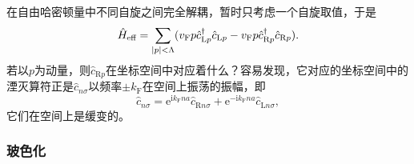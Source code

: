 \documentclass[hyperref, UTF8, a4paper]{ctexart}
\newcommand*{\ii}{\mathrm{i}}
\newcommand*{\ee}{\mathrm{e}}
\begin{document}
在自由哈密顿量中不同自旋之间完全解耦，暂时只考虑一个自旋取值，于是
\begin{equation}
    \hat{H}_\text{eff} = \sum_{\abs{p} < \Lambda} (v_\text{F} p \hat{c}^\dagger_{\text{L} p} \hat{c}_{\text{L} p} - v_\text{F} p \hat{c}^\dagger_{\text{R} p} \hat{c}_{\text{R} p}).
    \label{eq:one-dimension-linear-model}
\end{equation}
若以$p$为动量，则$\hat{c}_{\text{R} p}$在坐标空间中对应着什么？容易发现，它对应的坐标空间中的湮灭算符正是$\hat{c}_{n\sigma}$以频率$\pm k_\text{F}$在空间上振荡的振幅，即
\begin{equation}
    \hat{c}_{n\sigma} = \ee^{\ii k_\text{F} na} \hat{c}_{\text{R} n \sigma } + \ee^{ - \ii k_\text{F} na} \hat{c}_{\text{L} n \sigma},
\end{equation}
它们在空间上是缓变的。%

\subsubsection{玻色化}
\end{document}
